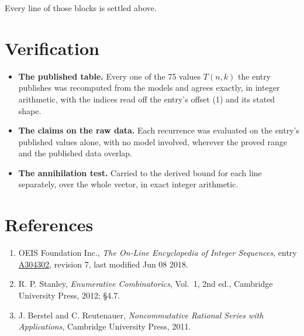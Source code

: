 \documentclass[11pt]{article}
\theoremstyle{definition}
\begin{document}
Every line of those blocks is settled above.

\section{Verification}

\begin{itemize}

\item {\bfseries The published table.} Every one of the 75 values $T(n,k)$ the entry publishes was recomputed from the models and agrees exactly, in integer arithmetic, with the indices read off the entry's offset (1) and its stated shape.

\item {\bfseries The claims on the raw data.} Each recurrence was evaluated on the entry's published values alone, with no model involved, wherever the proved range and the published data overlap.

\item {\bfseries The annihilation test.} Carried to the derived bound for each line separately, over the whole vector, in exact integer arithmetic.

\end{itemize}

\section{References}

\begin{enumerate}

\item OEIS Foundation Inc., \emph{The On-Line Encyclopedia of Integer Sequences}, entry \href{https://oeis.org/A304302}{A304302}, revision 7, last modified Jun 08 2018.

\item R. P. Stanley, \emph{Enumerative Combinatorics}, Vol.~1, 2nd ed., Cambridge University Press, 2012; \S4.7.

\item J. Berstel and C. Reutenauer, \emph{Noncommutative Rational Series with Applications}, Cambridge University Press, 2011.

\end{enumerate}
\end{document}
